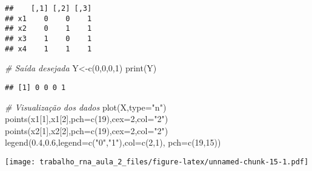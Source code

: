 \documentclass[
]{article}
\newenvironment{Shaded}{\begin{snugshade}}{\end{snugshade}}
\newcommand{\AttributeTok}[1]{\textcolor[rgb]{0.77,0.63,0.00}{#1}}
\newcommand{\CommentTok}[1]{\textcolor[rgb]{0.56,0.35,0.01}{\textit{#1}}}
\newcommand{\DecValTok}[1]{\textcolor[rgb]{0.00,0.00,0.81}{#1}}
\newcommand{\FloatTok}[1]{\textcolor[rgb]{0.00,0.00,0.81}{#1}}
\newcommand{\FunctionTok}[1]{\textcolor[rgb]{0.00,0.00,0.00}{#1}}
\newcommand{\NormalTok}[1]{#1}
\newcommand{\OtherTok}[1]{\textcolor[rgb]{0.56,0.35,0.01}{#1}}
\newcommand{\StringTok}[1]{\textcolor[rgb]{0.31,0.60,0.02}{#1}}
\begin{document}
\begin{verbatim}
##    [,1] [,2] [,3]
## x1    0    0    1
## x2    0    1    1
## x3    1    0    1
## x4    1    1    1
\end{verbatim}

\begin{Shaded}
\begin{Highlighting}[]
\CommentTok{\# Saída desejada}
\NormalTok{Y}\OtherTok{\textless{}{-}}\FunctionTok{c}\NormalTok{(}\DecValTok{0}\NormalTok{,}\DecValTok{0}\NormalTok{,}\DecValTok{0}\NormalTok{,}\DecValTok{1}\NormalTok{)}
\FunctionTok{print}\NormalTok{(Y)}
\end{Highlighting}
\end{Shaded}

\begin{verbatim}
## [1] 0 0 0 1
\end{verbatim}

\begin{Shaded}
\begin{Highlighting}[]
\CommentTok{\# Visualização dos dados}
\FunctionTok{plot}\NormalTok{(X,}\AttributeTok{type=}\StringTok{"n"}\NormalTok{)}
\FunctionTok{points}\NormalTok{(x1[}\DecValTok{1}\NormalTok{],x1[}\DecValTok{2}\NormalTok{],}\AttributeTok{pch=}\FunctionTok{c}\NormalTok{(}\DecValTok{19}\NormalTok{),}\AttributeTok{cex=}\DecValTok{2}\NormalTok{,}\AttributeTok{col=}\StringTok{"2"}\NormalTok{)}
\FunctionTok{points}\NormalTok{(x2[}\DecValTok{1}\NormalTok{],x2[}\DecValTok{2}\NormalTok{],}\AttributeTok{pch=}\FunctionTok{c}\NormalTok{(}\DecValTok{19}\NormalTok{),}\AttributeTok{cex=}\DecValTok{2}\NormalTok{,}\AttributeTok{col=}\StringTok{"2"}\NormalTok{)}
\FunctionTok{legend}\NormalTok{(}\FloatTok{0.4}\NormalTok{,}\FloatTok{0.6}\NormalTok{,}\AttributeTok{legend=}\FunctionTok{c}\NormalTok{(}\StringTok{"0"}\NormalTok{,}\StringTok{"1"}\NormalTok{),}\AttributeTok{col=}\FunctionTok{c}\NormalTok{(}\DecValTok{2}\NormalTok{,}\DecValTok{1}\NormalTok{), }\AttributeTok{pch=}\FunctionTok{c}\NormalTok{(}\DecValTok{19}\NormalTok{,}\DecValTok{15}\NormalTok{))}
\end{Highlighting}
\end{Shaded}

\texttt{[image: trabalho\_rna\_aula\_2\_files/figure-latex/unnamed-chunk-15-1.pdf]}
\end{document}
